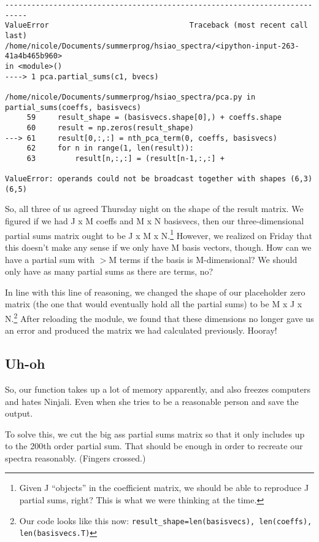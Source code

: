 \documentclass{article}
\begin{document}
\begin{verbatim}
---------------------------------------------------------------------------
ValueError                                Traceback (most recent call
last)
/home/nicole/Documents/summerprog/hsiao_spectra/<ipython-input-263-41a4b465b960>
in <module>()
----> 1 pca.partial_sums(c1, bvecs)

/home/nicole/Documents/summerprog/hsiao_spectra/pca.py in
partial_sums(coeffs, basisvecs)
     59     result_shape = (basisvecs.shape[0],) + coeffs.shape
     60     result = np.zeros(result_shape)
---> 61     result[0,:,:] = nth_pca_term(0, coeffs, basisvecs)
     62     for n in range(1, len(result)):
     63         result[n,:,:] = (result[n-1,:,:] +

ValueError: operands could not be broadcast together with shapes (6,3)
(6,5) 
\end{verbatim}

So, all three of us agreed Thursday night on the shape of the result matrix.  We
figured if we had J x M coeffs and M x N basisvecs, then our
three-dimensional partial sums matrix ought to be J x M x
N.\footnote{Given J ``objects'' in the coefficient matrix, we should
  be able to reproduce J partial sums, right?  This is what we were
  thinking at the time.}  However,
we realized on Friday that this doesn't make any sense if we only have
M basis vectors, though.  How can we have a partial sum with $>$M terms
if the basis is M-dimensional?  We should only have as many partial
sums as there are terms, no?

In line with this line of reasoning, we changed the shape of our
placeholder zero matrix (the one that would eventually hold all the
partial sums) to be M x J x N.\footnote{Our code looks like this
  now: \texttt{result\_shape=len(basisvecs), len(coeffs),
    len(basisvecs.T)}} After reloading the module, we found that these
dimensions no longer gave us an error and produced the matrix we had
calculated previously.  Hooray!

\subsection{Uh-oh}
\label{sec:99problems}

So, our function takes up a lot of memory apparently, and also freezes
computers and hates Ninjali.  Even when she tries to be a reasonable
person and save the output.

To solve this, we cut the big ass partial sums matrix so that it only
includes up to the 200th order partial sum.  That should be enough in
order to recreate our spectra reasonably.  (Fingers crossed.)
\end{document}

